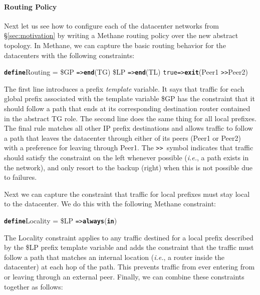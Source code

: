 \documentclass{sig-alternate-10pt}
\newcommand{\IE}{\emph{i.e.}}
\newcommand{\sysname}{{\small \sf Methane}\xspace}
\newcommand{\para}[1]{\paragraph*{\textbf{#1}}}
\newcommand{\CD}[1]{\texttt{\small #1}}  %
\newcommand{\KW}[1]{\texttt{\small\bfseries{#1}}}
\newcommand{\True}{\CD{true}}
\newcommand{\Define}{\KW{define}}
\newcommand{\Prefer}{\texttt{>>}}
\newcommand{\Path}{\texttt{=>}}
\newcommand{\In}{\KW{in}}
\newcommand{\Exit}{\KW{exit}}
\newcommand{\End}{\KW{end}}
\newcommand{\Always}{\KW{always}}
\begin{document}
%


\para{Routing Policy}

Next let us see how to configure each of the datacenter networks from \S\ref{sec:motivation} by writing a \sysname routing policy over the new abstract topology. In \sysname, we can capture the basic routing behavior for the datacenters with the following constraints:
%
\begin{code}
\Define Routing =
    \$GP  \Path \End(TG)
    \$LP  \Path \End(TL)
    \True \Path \Exit(Peer1 \Prefer Peer2)
\end{code}
\noindent%

The first line introduces a prefix \emph{template} variable. It says that traffic for each global prefix associated with the template variable \$GP has the constraint that it should follow a path that ends at its corresponding destination router contained in the abstract TG role. The second line does the same thing for all local prefixes. 
%
The final rule matches all other IP prefix destinations and allows traffic to follow a path that leaves the datacenter through either of its peers (Peer1 or Peer2) with a preference for leaving through Peer1. The \Prefer~symbol indicates that traffic should satisfy the constraint on the left whenever possible (\IE, a path exists in the network), and only resort to the backup (right) when this is not possible due to failures.%

Next we can capture the constraint that traffic for local prefixes must stay local to the datacenter.
We do this with the following \sysname constraint:
%
\begin{code}
\Define Locality = 
    \$LP \Path \Always(\In)
\end{code}
\noindent%
%
The Locality constraint applies to any traffic destined for a local prefix described by the \$LP prefix template variable and adds the constraint that the traffic must follow a path that matches an internal location (\IE, a router inside the datacenter) at each hop of the path. This prevents traffic from ever entering from or leaving through an external peer. Finally, we can combine these constraints together as follows:
\end{document}
